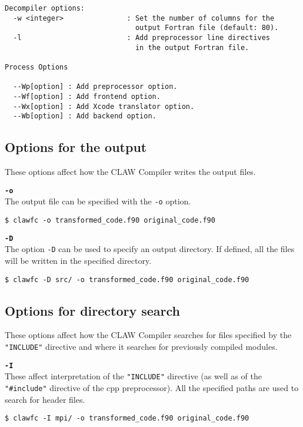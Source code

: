 \documentclass{article}
\begin{document}
\begin{lstlisting}
Decompiler options:
  -w <integer>               : Set the number of columns for the
                               output Fortran file (default: 80).
  -l                         : Add preprocessor line directives
                               in the output Fortran file.

Process Options

  --Wp[option] : Add preprocessor option.
  --Wf[option] : Add frontend option.
  --Wx[option] : Add Xcode translator option.
  --Wb[option] : Add backend option.
\end{lstlisting}

\subsection{Options for the output}
These options affect how the CLAW Compiler writes the output files.

\textbf{\texttt{-o}}\\
The output file can be specified with the \texttt{-o} option.
\begin{lstlisting}
$ clawfc -o transformed_code.f90 original_code.f90
\end{lstlisting}

\textbf{\texttt{-D}}\\
The option \texttt{-D} can be used to specify an output directory. If defined, all the files
will be written in the specified directory.

\begin{lstlisting}
$ clawfc -D src/ -o transformed_code.f90 original_code.f90
\end{lstlisting}

\subsection{Options for directory search}
These options affect how the CLAW Compiler searches for files specified by the
\texttt{"INCLUDE"} directive and where it searches for previously compiled modules.

\textbf{\texttt{-I}}\\
These affect interpretation of the \texttt{"INCLUDE"} directive (as well as of the \texttt{"\#include"} directive of the cpp preprocessor).
All the specified paths are used to search for header files.
\begin{lstlisting}
$ clawfc -I mpi/ -o transformed_code.f90 original_code.f90
\end{lstlisting}
\end{document}
